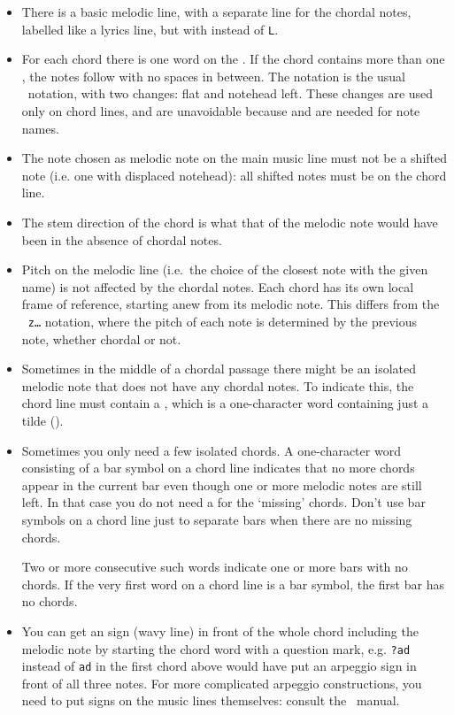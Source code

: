\documentclass[11pt]{article}
\begin{document}
\begin{itemize}
  \item  There is a basic melodic line, with a separate line for the chordal
notes, labelled like a lyrics line, but with  instead of \verb'L'.  
  \item  For each chord there is one word on the .  
  If the
chord contains more than one ,  
the notes follow with no spaces
in between.  The notation is the usual \PMX\ notation, with two changes: 
fla\mark t and notehead \mark left.  These changes are used only on chord 
lines, and are unavoidable because  and  are needed for 
note names.   
  \item  The note chosen as melodic note 
on the main music line must not
be a shifted note (i.e. one with displaced notehead): 
all shifted notes must be on the chord line.  
  \item  The stem direction of the chord is what that of the melodic
note would have been in the absence of chordal notes.
  \item  Pitch on the melodic line (i.e.~the choice of the closest note 
with the given name) is not affected by the chordal notes. Each chord has 
its own local frame of reference, starting anew from its melodic note. This 
differs from the \PMX\ \texttt{z\dots} notation, where the pitch of each 
note is determined by the previous note, whether chordal or not.
  \item  Sometimes in the middle of a chordal passage there might be an 
isolated melodic note that does not have any chordal notes. To indicate this, 
the chord line must contain a , which is a one-character word 
containing just a tilde (\ttxem{\snake}). 
  \item  Sometimes you only need a few isolated chords.  A one-character
word consisting of a bar symbol
\ttxem{\|} on a chord line indicates that no more chords appear in the
current bar even though one or more melodic notes are still left.  
In that case you do not need a \ttxem{\snake} for the `missing' chords.
Don't use bar symbols on a chord line just to separate bars when there
are no missing chords.

Two or more consecutive such words indicate one or more bars with no chords.
If the very first word on a chord line is a bar symbol, the first bar has no 
chords.  
  \item  You can get an  sign (wavy line) in front of the whole chord 
including the melodic note by starting the chord word with a question mark, 
e.g. \verb'?ad' instead of \verb'ad' in the first chord above would have put 
an arpeggio sign in front of all three notes.  For more complicated
arpeggio constructions, you need to put  signs on the music lines 
themselves: consult the \PMX~manual.         


\end{itemize}
\end{document}
